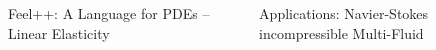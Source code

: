 \documentclass[final,utf8,,hyperref={pdfpagelabels=false}]{beamer}
\newcommand{\goodgap}{%
  \hspace{\subfigtopskip}%
  \hspace{\subfigbottomskip}}
\begin{document}
\begin{frame}[containsverbatim]{}
\begin{columns}[t]
\begin{block}{Feel++: A Language for PDEs -- Linear Elasticity}
  \end{block}


  \begin{block}{Applications: Navier-Stokes incompressible Multi-Fluid}
    
    \begin{columns}[t]
      \begin{column}{.45\textwidth}
        \begin{figure}
      \centering
      \goodgap
      \\
      \goodgap
      \\

\end{figure}
\end{column}
\end{columns}
\end{block}
\end{columns}
\end{frame}
\end{document}
